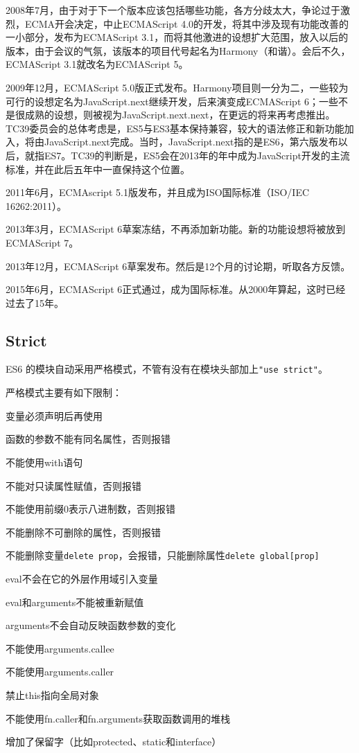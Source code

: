 2008年7月，由于对于下一个版本应该包括哪些功能，各方分歧太大，争论过于激烈，ECMA开会决定，中止ECMAScript 4.0的开发，将其中涉及现有功能改善的一小部分，发布为ECMAScript 3.1，而将其他激进的设想扩大范围，放入以后的版本，由于会议的气氛，该版本的项目代号起名为Harmony（和谐）。会后不久，ECMAScript 3.1就改名为ECMAScript 5。

2009年12月，ECMAScript 5.0版正式发布。Harmony项目则一分为二，一些较为可行的设想定名为JavaScript.next继续开发，后来演变成ECMAScript 6；一些不是很成熟的设想，则被视为JavaScript.next.next，在更远的将来再考虑推出。TC39委员会的总体考虑是，ES5与ES3基本保持兼容，较大的语法修正和新功能加入，将由JavaScript.next完成。当时，JavaScript.next指的是ES6，第六版发布以后，就指ES7。TC39的判断是，ES5会在2013年的年中成为JavaScript开发的主流标准，并在此后五年中一直保持这个位置。

2011年6月，ECMAscript 5.1版发布，并且成为ISO国际标准（ISO/IEC 16262:2011）。

2013年3月，ECMAScript 6草案冻结，不再添加新功能。新的功能设想将被放到ECMAScript 7。

2013年12月，ECMAScript 6草案发布。然后是12个月的讨论期，听取各方反馈。

2015年6月，ECMAScript 6正式通过，成为国际标准。从2000年算起，这时已经过去了15年。


\subsection{Strict}


ES6 的模块自动采用严格模式，不管有没有在模块头部加上\texttt{"use strict"}。


严格模式主要有如下限制：

\begin{compactitem}
\item 变量必须声明后再使用
\item 函数的参数不能有同名属性，否则报错
\item 不能使用with语句
\item 不能对只读属性赋值，否则报错
\item 不能使用前缀0表示八进制数，否则报错
\item 不能删除不可删除的属性，否则报错
\item 不能删除变量\texttt{delete prop}，会报错，只能删除属性\texttt{delete global[prop]}
\item eval不会在它的外层作用域引入变量
\item eval和arguments不能被重新赋值
\item arguments不会自动反映函数参数的变化
\item 不能使用arguments.callee
\item 不能使用arguments.caller
\item 禁止this指向全局对象
\item 不能使用fn.caller和fn.arguments获取函数调用的堆栈
\item 增加了保留字（比如protected、static和interface）
\end{compactitem}

